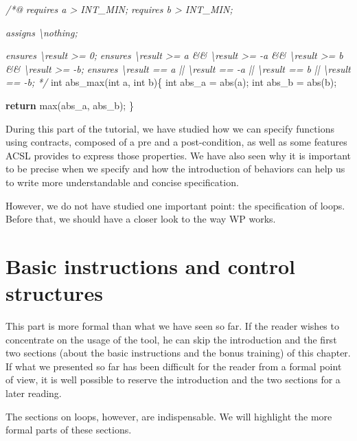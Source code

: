 \documentclass[12pt,francais,]{scrbook}
\newenvironment{Shaded}{}{}
\newcommand{\KeywordTok}[1]{\textcolor[rgb]{0.00,0.44,0.13}{\textbf{{#1}}}}
\newcommand{\DataTypeTok}[1]{\textcolor[rgb]{0.56,0.13,0.00}{{#1}}}
\newcommand{\CommentTok}[1]{\textcolor[rgb]{0.38,0.63,0.69}{\textit{{#1}}}}
\newcommand{\NormalTok}[1]{{#1}}
\newenvironment{zdsblock}[1]{%
  \tcolorbox[beamer,%
    noparskip,breakable,
    colback=LightBlue,colframe=DarkBlue,%
    colbacklower=DarkBlue,%
    title=#1]
}{\endtcolorbox}
\begin{document}
\begin{footnotesize}\begin{Shaded}
\begin{Highlighting}[]
\CommentTok{/*@}
\CommentTok{  requires a > INT_MIN;}
\CommentTok{  requires b > INT_MIN;}

\CommentTok{  assigns \textbackslash{}nothing;}

\CommentTok{  ensures \textbackslash{}result >= 0;}
\CommentTok{  ensures \textbackslash{}result >= a && \textbackslash{}result >= -a && \textbackslash{}result >= b && \textbackslash{}result >= -b;}
\CommentTok{  ensures \textbackslash{}result == a || \textbackslash{}result == -a || \textbackslash{}result == b || \textbackslash{}result == -b;}
\CommentTok{*/}
\DataTypeTok{int} \NormalTok{abs_max(}\DataTypeTok{int} \NormalTok{a, }\DataTypeTok{int} \NormalTok{b)\{}
  \DataTypeTok{int} \NormalTok{abs_a = abs(a);}
  \DataTypeTok{int} \NormalTok{abs_b = abs(b);}

  \KeywordTok{return} \NormalTok{max(abs_a, abs_b);}
\NormalTok{\}}
\end{Highlighting}
\end{Shaded}\end{footnotesize}

During this part of the tutorial, we have studied how we can specify
functions using contracts, composed of a pre and a post-condition, as
well as some features ACSL provides to express those properties. We have
also seen why it is important to be precise when we specify and how the
introduction of behaviors can help us to write more understandable and
concise specification.

However, we do not have studied one important point: the specification
of loops. Before that, we should have a closer look to the way WP works.

\chapter{Basic instructions and control
structures}\label{basic-instructions-and-control-structures}

\begin{zdsblock}{Information}
  This part is more formal than what we have seen so far. If the reader
  wishes to concentrate on the usage of the tool, he can skip the
  introduction and the first two sections (about the basic instructions
  and the bonus training) of this chapter. If what we presented so far has
  been difficult for the reader from a formal point of view,
  it is well possible to reserve the introduction and the two
  sections for a later reading.

  The sections on loops, however, are indispensable. We will highlight
  the more formal parts of these sections.
\end{zdsblock}
\end{document}
